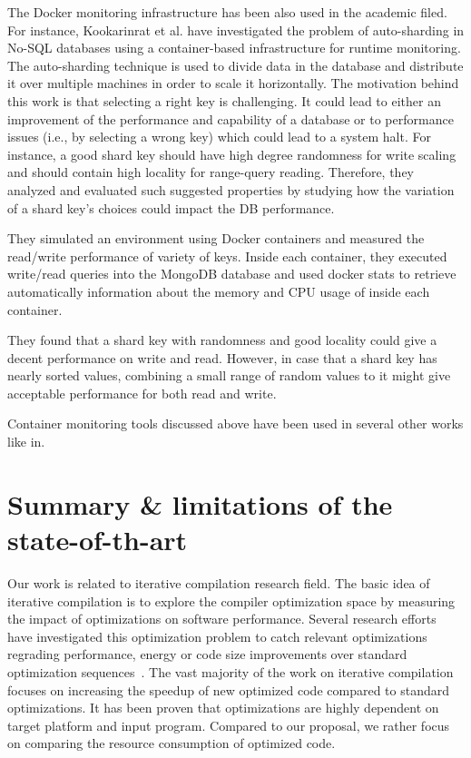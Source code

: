The Docker monitoring infrastructure has been also used in the academic filed. For instance, \cite{kookarinrat2015analysis} Kookarinrat et al. have investigated the problem of auto-sharding in No-SQL databases using a container-based infrastructure for runtime monitoring. 
The auto-sharding technique is used to divide data in the database and distribute it over multiple machines in order to scale it horizontally. The motivation behind this work is that selecting a right key is challenging. It could lead to either an improvement of the performance and capability of a database or to performance issues (i.e., by selecting a wrong key) which could lead to a system halt. 
For instance, a good shard key should have high degree randomness for write scaling and should contain high locality for range-query reading.
Therefore, they analyzed and evaluated such suggested properties by studying how the variation of a shard key’s choices could impact the DB performance.

They simulated an environment using Docker containers and measured the read/write performance of variety of keys. Inside each container, they executed write/read queries into the MongoDB database and used docker stats to retrieve automatically information about the memory and CPU usage of inside each container.

They found that a shard key with randomness and good locality could give a decent performance on write and
read. However, in case that a shard key has nearly sorted values, combining a small range of random values to it might give acceptable performance for both read and write. 
 

Container monitoring tools discussed above have been used in several other works like in\cite{peinl2016docker,medel2016modelling}.
\section{Summary \& limitations of the state-of-th-art}
 



\iffalse
Our work is related to iterative compilation research field.
The basic idea of iterative compilation is to explore the compiler optimization space by measuring the impact of optimizations on software performance.
Several research efforts have investigated this optimization problem to catch relevant optimizations regrading performance, energy or code size improvements over standard optimization sequences~\cite{almagor2004finding,hoste2008cole,pan2006fast,zhong2009tuning,pallister2015identifying,chen2012deconstructing,sandran2012genetic,martins2014exploration,fursin2008milepost,lin2008automatic,schulte2014post}. 
The vast majority of the work on iterative compilation focuses on increasing the speedup of new optimized code compared to standard optimizations. 
It has been proven that optimizations are highly dependent on target platform and input program. Compared to our proposal, we rather focus on comparing the resource consumption of optimized code.

